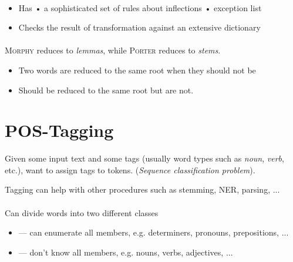 \documentclass[10pt,twocolumn]{article}
\begin{document}
\paragraph{ }
\begin{itemize}
\item Has  •  a sophisticated set of rules about inflections  • exception list
\item Checks the result of transformation against an extensive dictionary
\end{itemize}

\paragraph{} \textsc{Morphy} reduces to \textit{lemmas}, while
\textsc{Porter} reduces to \textit{stems}.

\begin{itemize}
\item \textbf{} Two words are reduced to the same root when
  they should not be
\item \textbf{} Should be reduced to the same root but are not.
\end{itemize}


\section{POS-Tagging}

Given some input text and some tags (usually word types such as \textit{noun},
\textit{verb}, etc.), want to assign tags to tokens. (\textit{Sequence
  classification problem}).

Tagging can help with other procedures such as stemming, NER, parsing, ...

\paragraph{} Can divide words into two different classes
\begin{itemize}
  \item \textbf{} --- can enumerate all members, e.g.
    determiners, pronouns, prepositions, ...
\item \textbf{} --- don't know all members, e.g. nouns, verbs,
  adjectives, ...
\end{itemize}
\end{document}
